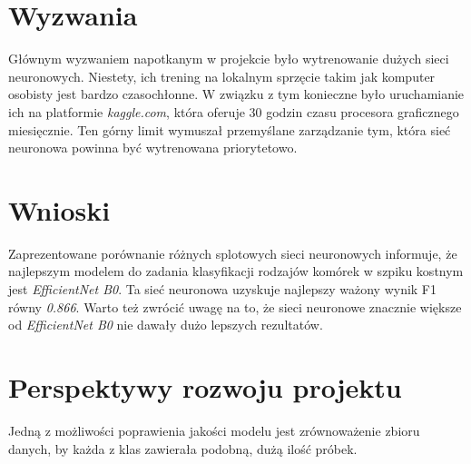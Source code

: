 \section{Wyzwania}

Głównym wyzwaniem napotkanym w projekcie było wytrenowanie dużych sieci neuronowych. Niestety, ich trening na lokalnym sprzęcie takim jak komputer osobisty jest bardzo czasochłonne.
W związku z tym konieczne było uruchamianie ich na platformie \textit{kaggle.com}, która oferuje 30 godzin czasu procesora graficznego miesięcznie.
Ten górny limit wymuszał przemyślane zarządzanie tym, która sieć neuronowa powinna być wytrenowana priorytetowo.

\section{Wnioski}

Zaprezentowane porównanie różnych splotowych sieci neuronowych informuje, że najlepszym modelem do zadania klasyfikacji rodzajów komórek w szpiku kostnym jest \textit{EfficientNet B0}.
Ta sieć neuronowa uzyskuje najlepszy ważony wynik F1 równy \textit{0.866}.
Warto też zwrócić uwagę na to, że sieci neuronowe znacznie większe od \textit{EfficientNet B0} nie dawały dużo lepszych rezultatów.

\section{Perspektywy rozwoju projektu}

Jedną z możliwości poprawienia jakości modelu jest zrównoważenie zbioru danych, by każda z klas zawierała podobną, dużą ilość próbek.
